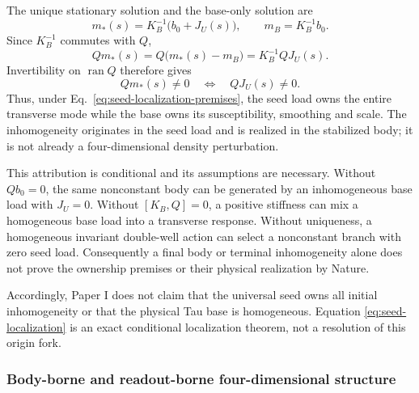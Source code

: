 \documentclass[11pt]{article}
\begin{document}
The unique stationary solution and the base-only solution are
\begin{equation}
 m_*(s)=K_B^{-1}\bigl(b_0+J_U(s)\bigr),
 \qquad m_B=K_B^{-1}b_0.
\end{equation}
Since $K_B^{-1}$ commutes with $Q$,
\begin{equation}
 \boxed{Qm_*(s)=Q\bigl(m_*(s)-m_B\bigr)=K_B^{-1}QJ_U(s).}
 \label{eq:seed-localization}
\end{equation}
Invertibility on $\operatorname{ran}Q$ therefore gives
\begin{equation}
 Qm_*(s)\neq0\quad\Longleftrightarrow\quad QJ_U(s)\neq0.
\end{equation}
Thus, under Eq.~\eqref{eq:seed-localization-premises}, the seed load owns the
entire transverse mode while the base owns its susceptibility, smoothing and
scale. The inhomogeneity originates in the seed load and is realized in the
stabilized body; it is not already a four-dimensional density perturbation.

This attribution is conditional and its assumptions are necessary. Without
$Qb_0=0$, the same nonconstant body can be generated by an inhomogeneous base
load with $J_U=0$. Without $[K_B,Q]=0$, a positive stiffness can mix a
homogeneous base load into a transverse response. Without uniqueness, a
homogeneous invariant double-well action can select a nonconstant branch with
zero seed load. Consequently a final body or terminal inhomogeneity alone
does not prove the ownership premises or their physical realization by
Nature.

Accordingly, Paper I does not claim that the universal seed owns all initial
inhomogeneity or that the physical Tau base is homogeneous. Equation
\eqref{eq:seed-localization} is an exact conditional localization theorem,
not a resolution of this origin fork.

\subsubsection{Body-borne and readout-borne four-dimensional structure}
\end{document}
